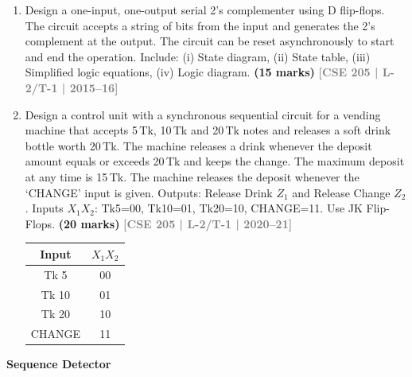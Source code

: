 \documentclass[12pt,a3paper]{article}
\newcommand{\yr}[1]{\hfill\textcolor{gray}{\small\textbf{[#1]}}}
\newcommand{\mk}[1]{\textcolor{orange!70!black}{\small\textbf{(#1 marks)}}}
\newcommand{\subtopic}[2]{%
  \vspace{10pt}
  \noindent\begin{tcolorbox}[colback=#1!8,colframe=#1,boxrule=0.6pt,arc=4pt,
    left=6pt,right=6pt,top=4pt,bottom=4pt]
    \small\bfseries\textcolor{#1}{#2}
  \end{tcolorbox}
  \vspace{2pt}
}
\begin{document}
\begin{enumerate}
\begin{center}
\begin{tikzpicture}
\end{tikzpicture}
\end{center}

\mk{21} \yr{CSE 205 | L-2/T-1 | 2013--14}



\item Design a one-input, one-output serial 2's complementer using D flip-flops. The circuit accepts a string of bits from the input and generates the 2's complement at the output. The circuit can be reset asynchronously to start and end the operation. Include: (i) State diagram, (ii) State table, (iii) Simplified logic equations, (iv) Logic diagram.
\mk{15} \yr{CSE 205 | L-2/T-1 | 2015--16}


\item Design a control unit with a synchronous sequential circuit for a vending machine that accepts 5\,Tk, 10\,Tk and 20\,Tk notes and releases a soft drink bottle worth 20\,Tk. The machine releases a drink whenever the deposit amount equals or exceeds 20\,Tk and keeps the change. The maximum deposit at any time is 15\,Tk. The machine releases the deposit whenever the `CHANGE' input is given. Outputs: Release Drink $Z_1$ and Release Change $Z_2$. Inputs $X_1X_2$: Tk5=00, Tk10=01, Tk20=10, CHANGE=11. Use JK Flip-Flops.
\mk{20} \yr{CSE 205 | L-2/T-1 | 2020--21}

\begin{center}
  \begin{tabular}{|c|c|}
\hline
Input & $X_1X_2$ \\
\hline
Tk 5 & 00 \\
\hline
Tk 10 & 01 \\
\hline
Tk 20 & 10 \\
\hline
CHANGE & 11 \\
\hline
\end{tabular}
\end{center}


\end{enumerate}

\subtopic{cF}{Sequence Detector}
\label{sub:s6-sequence}
\end{document}
